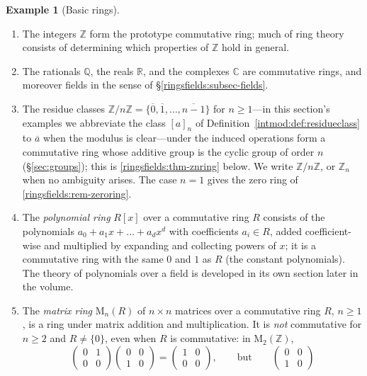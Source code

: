\documentclass[11pt,a4paper]{article}
\theoremstyle{definition}
\newtheorem{example}[theorem]{Example}
\theoremstyle{remark}
\newcommand{\Z}{\ensuremath{\mathbb{Z}}}
\newcommand{\Q}{\ensuremath{\mathbb{Q}}}
\newcommand{\R}{\ensuremath{\mathbb{R}}}
\providecommand{\C}{}\renewcommand{\C}{\ensuremath{\mathbb{C}}}
\begin{document}
\begin{example}[Basic rings]\label{ringsfields:exa-rings}
\begin{enumerate}
\item The integers \(\Z\) form the prototype commutative ring; much of ring
  theory consists of determining which properties of \(\Z\) hold in
  general.
\item The rationals \(\Q\), the reals \(\R\), and the complexes \(\C\) are
  commutative rings, and moreover fields in the sense of
  \S\ref{ringsfields:subsec-fields}.
\item The residue classes \(\Z/n\Z=\{\overline{0},\overline{1},\dots,
  \overline{n-1}\}\) for \(n\ge 1\)---in this section's examples we
  abbreviate the class \([a]_n\) of
  Definition~\ref{intmod:def:residueclass} to \(\overline{a}\) when the
  modulus is clear---under the induced operations form a
  commutative ring whose additive group is the cyclic group of order \(n\)
  (\S\ref{sec:groups}); this is \cref{ringsfields:thm-znring} below. We
  write \(\Z/n\Z\), or \(\Z_n\) when no ambiguity arises. The case
  \(n=1\) gives the zero ring of \cref{ringsfields:rem-zeroring}.
\item The \emph{polynomial ring} \(R[x]\) over a commutative ring \(R\)
  consists of the polynomials \(a_0+a_1x+\dots+a_dx^d\) with coefficients
  \(a_i\in R\), added coefficient-wise and multiplied by expanding and
  collecting powers of \(x\); it is a commutative ring with the same \(0\)
  and \(1\) as \(R\) (the constant polynomials). The theory of polynomials
  over a field is developed in its own section later in the volume.
\item The \emph{matrix ring} \(\mathrm{M}_n(R)\) of \(n\times n\) matrices
  over a commutative ring \(R\), \(n\ge 1\), is a ring under matrix
  addition and multiplication. It is \emph{not} commutative for
  \(n\ge 2\) and \(R\ne\{0\}\), even when \(R\) is commutative:
  in \(\mathrm{M}_2(\Z)\),
  \[
  \begin{pmatrix}0&1\\0&0\end{pmatrix}
  \begin{pmatrix}0&0\\1&0\end{pmatrix}
  =\begin{pmatrix}1&0\\0&0\end{pmatrix},
  \qquad\text{but}\qquad
  \begin{pmatrix}0&0\\1&0\end{pmatrix}
\]
\end{enumerate}
\end{example}
\end{document}

